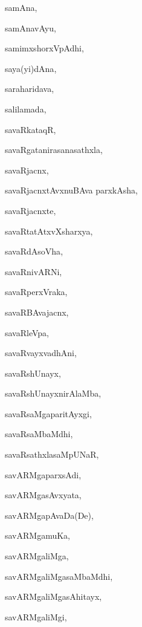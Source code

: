 \begin{multicols}{2}
{samAna}, \pageref{samAna}

{samAnavAyu}, \pageref{samAnavAyu}

{samimxshorxVpAdhi}, \pageref{samimxshorxVpAdhi}

{saya(yi)dAna}, \pageref{sayayidAna}

{saraharidava}, \pageref{saraharidava}

{salilamada}, \pageref{salilamada}

{savaRkataqR}, \pageref{savaRkataqR}

{savaRgatanirasanasathxla}, \pageref{savaRgatanirasanasathxla}

{savaRjacnx}, \pageref{savaRjacnx}

{savaRjacnxtAvxnuBAva parxkAsha}, \pageref{savaRjacnxtAvxnuBAvaparxkAsha}

{savaRjacnxte}, \pageref{savaRjacnxte}

{savaRtatAtxvXsharxya}, \pageref{savaRtatAtxvXsharxya}

{savaRdAsoVha}, \pageref{savaRdAsoVha}

{savaRnivARNi}, \pageref{savaRnivARNi}

{savaRperxVraka}, \pageref{savaRperxVraka}

{savaRBAvajacnx}, \pageref{savaRBAvajacnx}

{savaRleVpa}, \pageref{savaRleVpa}

{savaRvayxvadhAni}, \pageref{savaRvayxvadhAni}

{savaRshUnayx}, \pageref{savaRshUnayx}

{savaRshUnayxnirAlaMba}, \pageref{savaRshUnayxnirAlaMba}

{savaRsaMgaparitAyxgi}, \pageref{savaRsaMgaparitAyxgi}

{savaRsaMbaMdhi}, \pageref{savaRsaMbaMdhi}

{savaRsathxlasaMpUNaR}, \pageref{savaRsathxlasaMpUNaR}

{savARMgaparxsAdi}, \pageref{savARMgaparxsAdi}

{savARMgasAvxyata}, \pageref{savARMgasAvxyata}

{savARMgapAvaDa(De)}, \pageref{savARMgapAvaDaDe}

{savARMgamuKa}, \pageref{savARMgamuKa}

{savARMgaliMga}, \pageref{savARMgaliMga}

{savARMgaliMgasaMbaMdhi}, \pageref{savARMgaliMgasaMbaMdhi}

{savARMgaliMgasAhitayx}, \pageref{savARMgaliMgasAhitayx}

{savARMgaliMgi}, \pageref{savARMgaliMgi}


\end{multicols}
